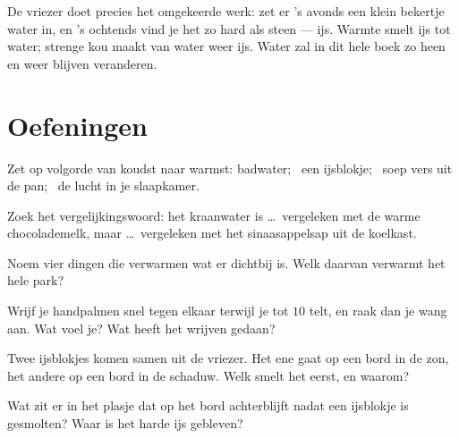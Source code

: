 \begin{example}\label{ex:g1:hot-and-cold:freezer}
De vriezer doet precies het omgekeerde werk: zet er 's avonds een
klein bekertje water in, en 's ochtends vind je het zo hard als
steen --- ijs. Warmte smelt ijs tot water; strenge kou maakt van
water weer ijs. Water zal in dit hele boek zo heen en weer blijven
veranderen.
\end{example}

\section{Oefeningen}

\begin{exercise}[$\star$]\label{exo:g1:hot-and-cold:1}
Zet op volgorde van koudst naar warmst: badwater; \ een ijsblokje; \
soep vers uit de pan; \ de lucht in je slaapkamer.
\end{exercise}

\begin{exercise}[$\star$]\label{exo:g1:hot-and-cold:2}
Zoek het vergelijkingswoord: het kraanwater is \dots\ vergeleken met
de warme chocolademelk, maar \dots\ vergeleken met het
sinaasappelsap uit de koelkast.
\end{exercise}

\begin{exercise}[$\star$]\label{exo:g1:hot-and-cold:3}
Noem vier dingen die verwarmen wat er dichtbij is. Welk daarvan
verwarmt het hele park?
\end{exercise}

\begin{exercise}[$\star$]\label{exo:g1:hot-and-cold:4}
Wrijf je handpalmen snel tegen elkaar terwijl je tot $10$ telt, en
raak dan je wang aan. Wat voel je? Wat heeft het wrijven gedaan?
\end{exercise}

\begin{exercise}[$\star$]\label{exo:g1:hot-and-cold:5}
Twee ijsblokjes komen samen uit de vriezer. Het ene gaat op een bord
in de zon, het andere op een bord in de schaduw. Welk smelt het
eerst, en waarom?
\end{exercise}

\begin{exercise}[$\star$]\label{exo:g1:hot-and-cold:6}
Wat zit er in het plasje dat op het bord achterblijft nadat een
ijsblokje is gesmolten? Waar is het harde ijs gebleven?
\end{exercise}

